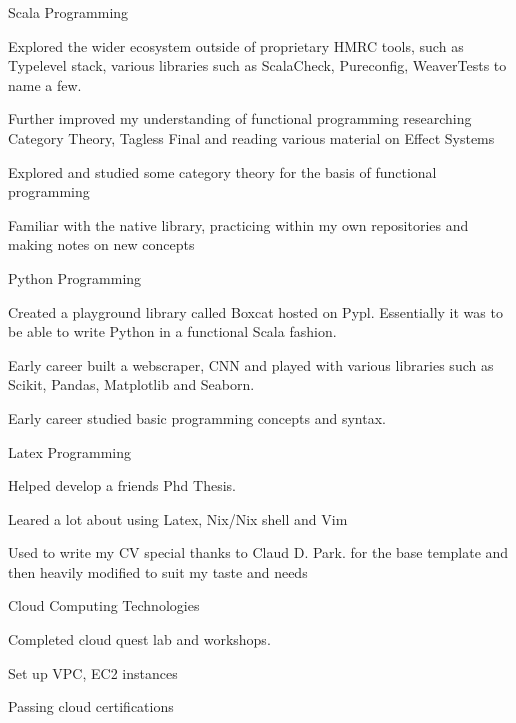\begin{cventries}
  \cventry
  {Scala Programming} %
  {} %
  {} %
  {} %
  {
    \begin{cvitems}
      \item {Explored the wider ecosystem outside of proprietary HMRC tools, such as Typelevel stack, various libraries such as ScalaCheck, Pureconfig, WeaverTests to name a few.}
      \item {Further improved my understanding of functional programming researching Category Theory, Tagless Final and reading various material on Effect Systems}
      \item {Explored and studied some category theory for the basis of functional programming}
      \item {Familiar with the native library, practicing within my own repositories and making notes on new concepts}
    \end{cvitems}
  }
  \cventry
  {Python Programming} %
  {} %
  {} %
  {} %
  {
    \begin{cvitems}
      \item {Created a playground library called Boxcat hosted on Pypl. Essentially it was to be able to write Python in a functional Scala fashion.}
      \item {Early career built a webscraper, CNN and played with various libraries such as Scikit, Pandas, Matplotlib and Seaborn.}
      \item {Early career studied basic programming concepts and syntax.}
    \end{cvitems}
  }
\cventry
{Latex Programming} %
{} %
{} %
{} %
{
  \begin{cvitems}
    \item {Helped develop a friends Phd Thesis.}
    \item {Leared a lot about using Latex, Nix/Nix shell and Vim}
    \item {Used to write my CV special thanks to Claud D. Park. for the base template and then heavily modified to suit my taste and needs}
  \end{cvitems}
}

  \cventry
  {Cloud Computing Technologies} %
  {} %
  {} %
  {} %
  {
    \begin{cvitems}
      \item {Completed cloud quest lab and workshops.}
      \item {Set up VPC,  EC2 instances}
      \item {Passing cloud certifications}
    \end{cvitems}
  }

\end{cventries}
